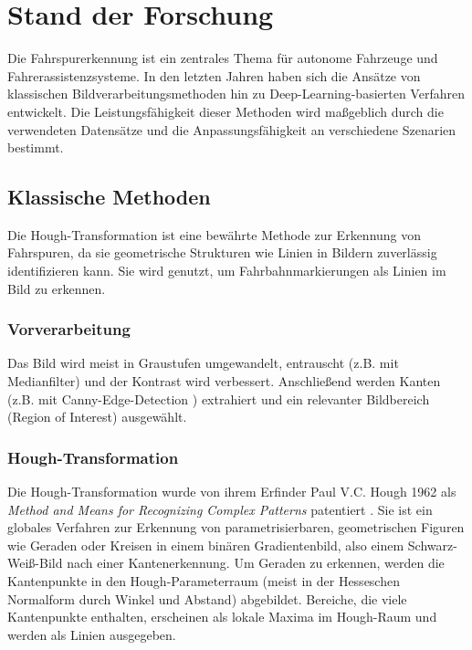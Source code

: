 \chapter{Stand der Forschung}

\label{StandDerForschung}


Die Fahrspurerkennung ist ein zentrales Thema für autonome Fahrzeuge und Fahrerassistenzsysteme. In den letzten Jahren haben sich die Ansätze von klassischen Bildverarbeitungsmethoden hin zu Deep-Learning-basierten Verfahren entwickelt. Die Leistungsfähigkeit dieser Methoden wird ma{\ss}geblich durch die verwendeten Datensätze und die Anpassungsfähigkeit an verschiedene Szenarien bestimmt.


\section{Klassische Methoden}
\label{chapter_klassische_methoden}
    Die Hough-Transformation ist eine bewährte Methode zur Erkennung von Fahrspuren, da sie geometrische Strukturen wie Linien in Bildern zuverlässig identifizieren kann. Sie wird genutzt, um Fahrbahnmarkierungen als Linien im Bild zu erkennen.

    \subsection{Vorverarbeitung}
        Das Bild wird meist in Graustufen umgewandelt, entrauscht (z.B. mit Medianfilter) und der Kontrast wird verbessert. Anschlie{\ss}end werden Kanten (z.B. mit Canny-Edge-Detection \cite{Canny}) extrahiert und ein relevanter Bildbereich (Region of Interest) ausgewählt.

    \subsection{Hough-Transformation}
        Die Hough-Transformation wurde von ihrem Erfinder Paul V.C. Hough 1962 als \textit{Method and Means for Recognizing Complex Patterns} patentiert \cite{HoughPatent}. Sie ist ein globales Verfahren zur Erkennung von parametrisierbaren, geometrischen Figuren wie Geraden oder Kreisen in einem binären Gradientenbild, also einem Schwarz-Wei{\ss}-Bild nach einer Kantenerkennung.
        Um Geraden zu erkennen, werden die Kantenpunkte in den Hough-Parameterraum (meist in der Hesseschen Normalform durch Winkel und Abstand) abgebildet. Bereiche, die viele Kantenpunkte enthalten, erscheinen als lokale Maxima im Hough-Raum und werden als Linien ausgegeben.

